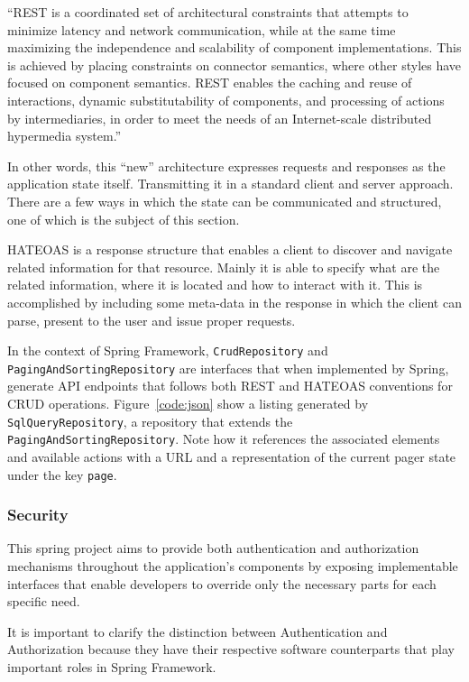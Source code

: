 \begin{displayquote}
  ``REST is a coordinated set of architectural constraints that attempts to minimize latency and network communication, while at the same time maximizing the independence and scalability of component implementations. This is achieved  by  placing  constraints  on  connector  semantics,  where  other  styles have focused on component semantics. REST enables the caching and reuse of interactions, dynamic substitutability of components, and processing of actions by intermediaries, in order to meet the needs of an Internet-scale distributed hypermedia system.''~\cite{fielding}
\end{displayquote}

In other words, this ``new'' architecture expresses requests and responses as the application state itself. Transmitting it in a standard client and server approach. There are a few ways in which the state can be communicated and structured, one of which is the subject of this section. 

\gls{HATEOAS} is a response structure that enables a client to discover and navigate related information for that resource\cite{fielding}. Mainly it is able to specify what are the related information, where it is located and how to interact with it. This is accomplished by including some meta-data in the response in which the client can parse, present to the user and issue proper requests.

In the context of Spring Framework, \texttt{CrudRepository} and \texttt{PagingAndSortingRepository} are interfaces that when implemented by Spring, generate \gls{API} endpoints that follows both \gls{REST} and \gls{HATEOAS} conventions for \gls{CRUD} operations. Figure~\ref{code:json} show a listing generated by \texttt{SqlQueryRepository}, a repository that extends the \texttt{PagingAndSortingRepository}. Note how it references the associated elements and available actions with a \gls{URL} and a representation of the current pager state under the key \texttt{page}.

\subsubsection{Security}
This spring project aims to provide both authentication and authorization mechanisms throughout the application's components by exposing implementable interfaces that enable developers to override only the necessary parts for each specific need.

It is important to clarify the distinction between Authentication and Authorization because they have their respective software counterparts that play important roles in Spring Framework.

